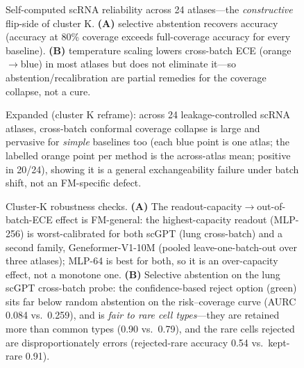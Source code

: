 \documentclass[fleqn,10pt,lineno]{wlpeerj}  %
\newcommand{\fitfig}[1]{\resizebox{\ifdim\width>\linewidth\linewidth\else\width\fi}{!}{#1}}
\begin{document}
\begin{figure}[htb]\centering\fitfig{}
\caption{Self-computed scRNA reliability across 24 atlases---the \emph{constructive} flip-side of cluster K. \textbf{(A)} selective abstention recovers accuracy (accuracy at 80\% coverage exceeds full-coverage accuracy for every baseline). \textbf{(B)} temperature scaling lowers cross-batch ECE (orange$\to$blue) in most atlases but does not eliminate it---so abstention/recalibration are partial remedies for the coverage collapse, not a cure.}\label{fig:scrnarel}\end{figure}

\begin{figure}[htb]\centering\fitfig{}
\caption{Expanded (cluster K reframe): across 24 leakage-controlled scRNA atlases, cross-batch conformal coverage collapse is large and pervasive for \emph{simple} baselines too (each blue point is one atlas; the labelled orange point per method is the across-atlas mean; positive in 20/24), showing it is a general exchangeability failure under batch shift, not an FM-specific defect.}\label{fig:multicov}\end{figure}

\begin{figure}[htb]\centering\fitfig{}
\caption{Cluster-K robustness checks. \textbf{(A)} The readout-capacity$\to$out-of-batch-ECE effect is FM-general: the highest-capacity readout (MLP-256) is worst-calibrated for both scGPT (lung cross-batch) and a second family, Geneformer-V1-10M (pooled leave-one-batch-out over three atlases); MLP-64 is best for both, so it is an over-capacity effect, not a monotone one. \textbf{(B)} Selective abstention on the lung scGPT cross-batch probe: the confidence-based reject option (green) sits far below random abstention on the risk--coverage curve (AURC 0.084 vs.\ 0.259), and is \emph{fair to rare cell types}---they are retained more than common types (0.90 vs.\ 0.79), and the rare cells rejected are disproportionately errors (rejected-rare accuracy 0.54 vs.\ kept-rare 0.91).}\label{fig:kaddon}\end{figure}
\end{document}
